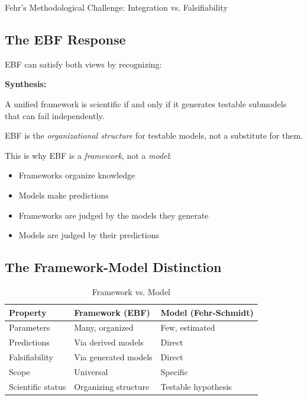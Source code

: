 \begin{chapter}{Fehr's Methodological Challenge: Integration vs. Falsifiability}
\subsection{The EBF Response}

EBF can satisfy both views by recognizing:

\begin{tcolorbox}[colback=green!5!white,colframe=green!75!black]
\textbf{Synthesis:}

A unified framework is scientific if and only if it generates testable submodels that can fail independently.

EBF is the \textit{organizational structure} for testable models, not a substitute for them.
\end{tcolorbox}

This is why EBF is a \textit{framework}, not a \textit{model}:
\begin{itemize}[noitemsep]
    \item Frameworks organize knowledge
    \item Models make predictions
    \item Frameworks are judged by the models they generate
    \item Models are judged by their predictions
\end{itemize}

\subsection{The Framework-Model Distinction}

\begin{table}[h]
\centering
\caption{Framework vs. Model}
\label{tab:framework-model}
\renewcommand{\arraystretch}{1.3}
\begin{tabular}{@{}lll@{}}
\toprule
\textbf{Property} & \textbf{Framework (EBF)} & \textbf{Model (Fehr-Schmidt)} \\
\midrule
Parameters & Many, organized & Few, estimated \\
Predictions & Via derived models & Direct \\
Falsifiability & Via generated models & Direct \\
Scope & Universal & Specific \\
Scientific status & Organizing structure & Testable hypothesis \\
\bottomrule
\end{tabular}
\end{table}


\end{chapter}
